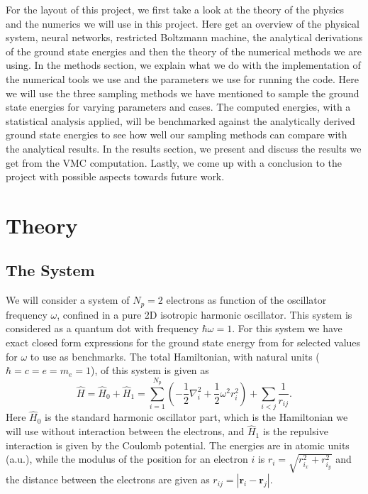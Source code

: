 \documentclass[12pt,a4paper,english]{article}
\begin{document}
For the layout of this project, we first take a look at the theory of the physics and the numerics we will use in this project. Here get an overview of the physical system, neural networks, restricted Boltzmann machine, the analytical derivations of the ground state energies and then the theory of the numerical methods we are using. In the methods section, we explain what we do with the implementation of the numerical tools we use and the parameters we use for running the code. Here we will use the three sampling methods we have mentioned to sample the ground state energies for varying parameters and cases. The computed energies, with a statistical analysis applied, will be benchmarked against the analytically derived ground state energies to see how well our sampling methods can compare with the analytical results. In the results section, we present and discuss the results we get from the VMC computation. Lastly, we come up with a conclusion to the project with possible aspects towards future work.


\section{Theory}
\label{sect:Theory}
\subsection{The System}
\label{subsect:System}
We will consider a system of $N_p=2$ electrons as function of the oscillator frequency $\omega$, confined in a pure 2D isotropic harmonic oscillator. This system is considered as a quantum dot with frequency $\hbar\omega=1$. For this system we have exact closed form expressions for the ground state energy from \citet{taut1993two} for selected values for $\omega$ to use as benchmarks. The total Hamiltonian, with natural units ($\hbar=c=e=m_e=1$), of this system is given as 
\begin{equation}
\label{eq:Hamlitonian}
\hat{H}=\hat{H}_0+\hat{H}_1=\sum_{i=1}^{N_p}\left(-\frac{1}{2}\nabla^2_i + \frac{1}{2}\omega^2r_i^2\right) + \sum_{i<j}\frac{1}{r_{ij}}.
\end{equation}
Here $\hat{H}_0$ is the standard harmonic oscillator part, which is the Hamiltonian we will use without interaction between the electrons, and $\hat{H}_1$ is the repulsive interaction is given by the Coulomb potential. The energies are in atomic units (a.u.), while the modulus of the position for an electron $i$ is $r_i=\sqrt{r^2_{i_x}+r^2_{i_y}}$ and the distance between the electrons are given as $r_{ij}=|\textbf{r}_i-\textbf{r}_j|$.
\end{document}
